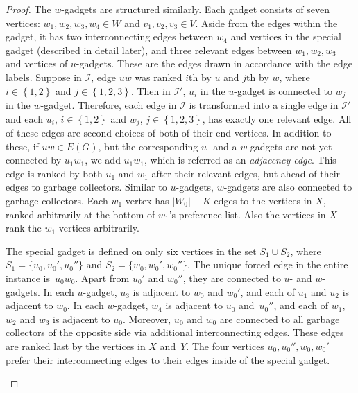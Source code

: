 \documentclass[preprint,12pt]{elsarticle}
\begin{document}
\begin{proof}
	The $w$-gadgets are structured similarly. Each gadget consists of seven vertices: $w_1, w_2, w_3, w_4 \in W$ and $v_1, v_2, v_3 \in V$. Aside from the edges within the gadget, it has two interconnecting edges between $w_4$ and vertices in the special gadget (described in detail later), and three relevant edges between $w_1, w_2, w_3$ and vertices of $u$-gadgets. These are the edges drawn in accordance with the edge labels. Suppose in $\mathcal I$, edge $uw$ was ranked $i$th by $u$ and $j$th by $w$, where $i \in \left\{1,2 \right\}$ and $j \in \left\{1,2,3 \right\}$. Then in $\mathcal I'$, $u_i$ in the $u$-gadget is connected to $w_j$ in the $w$-gadget. Therefore, each edge in $\mathcal{I}$ is transformed into a single edge in $\mathcal{I'}$ and each $u_i$, $i \in \left\{1,2 \right\}$ and $w_j$, $j \in \left\{1,2,3 \right\}$, has exactly one relevant edge. All of these edges are second choices of both of their end vertices. In addition to these, if $uw \in E(G)$, but the corresponding $u$- and a $w$-gadgets are not yet connected by $u_1w_1$, we add $u_1w_1$, which is referred as an \emph{adjacency edge}. This edge is ranked by both $u_1$ and $w_1$ after their relevant edges, but ahead of their edges to garbage collectors. Similar to $u$-gadgets, $w$-gadgets are also connected to garbage collectors. Each $w_1$ vertex has $|W_0|-K$ edges to the vertices in $X$, ranked arbitrarily at the bottom of $w_1$'s preference list. Also the vertices in $X$ rank the $w_1$ vertices arbitrarily.
	
	The special gadget is defined on only six vertices in the set $S_1\cup S_2$, where $S_1=\{u_0, u_0',u_0''\}$ and $S_2=\{w_0,w_0',w_0''\}$. The unique forced edge in the entire instance is~$u_0 w_0$. Apart from $u_0'$ and $w_0''$, they are connected to $u$- and $w$-gadgets. In each $u$-gadget, $u_3$ is adjacent to $w_0$ and $w_0'$, and each of $u_1$ and $u_2$ is adjacent to $w_0$.  In each $w$-gadget, $w_4$ is adjacent to $u_0$ and~$u_0''$, and each of $w_1$, $w_2$ and $w_3$ is adjacent to $u_0$.  Moreover, $u_0$ and $w_0$ are connected to all garbage collectors of the opposite side via additional interconnecting edges.  These edges are ranked last by the vertices in $X$ and~$Y$.  The four vertices $u_0,u_0'',w_0,w_0'$ prefer their interconnecting edges to their edges inside of the special gadget. 

\begin{figure}[htb]
\centering
{}
\end{figure}
\end{proof}
\end{document}
